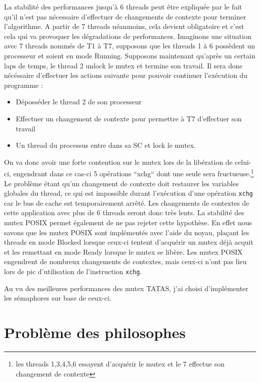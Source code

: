 \noindent La stabilité des performances jusqu'à 6 threads peut être expliquée par le fait qu'il n'est pas nécessaire d'effectuer de changements de contexte pour terminer l'algorithme. 
A partir de 7 threads néanmoins, cela devient obligatoire et c'est cela qui va provoquer les dégradations de performances. Imaginons une situation avec 7 threads nommés de T1 à T7, supposons que les threads 1 à 6 possèdent un processeur et soient en mode Running. 
Supposons maintenant qu'après un certain laps de temps, le thread 2 unlock le mutex et termine son travail. Il sera donc nécéssaire d'effectuer les actions suivante pour pouvoir continuer l'exécution du programme : 
\begin{itemize}
    \item Déposséder le thread 2 de son processeur
    \item Effectuer un changement de contexte pour permettre à T7 d'effectuer son travail
    \item Un thread du processus entre dans sa SC et lock le mutex. 
\end{itemize}
On va donc avoir une forte contention sur le mutex lors de la libération de celui-ci, engendrant dans ce cas-ci 5 opérations ``xchg`` dont une seule sera fructueuse.\footnote{les threads 1,3,4,5,6 essayent d'acquérir le mutex et le 7 effectue son changement de contexte}
Le problème étant qu'un changement de contexte doit restaurer les variables globales du thread, ce qui est impossible durant l'exécution d'une opération \texttt{xchg} car le bus de cache est temporairement arrêté. 
Les changements de contextes de cette application avec plus de 6 threads seront donc très lents. La stabilité des mutex POSIX permet également de ne pas rejeter cette hypothèse. En effet nous savons que les mutex POSIX sont implémentés avec l'aide du noyau, 
plaçant les threads en mode Blocked lorsque ceux-ci tentent d'acquérir un mutex déjà acquit et les remettant en mode Ready lorsque le mutex se libère. Les mutex POSIX engendrent de nombreux changements de contextes, mais ceux-ci n'ont pas lieu lors de pic d'utilisation de l'instruction \texttt{xchg}.

\noindent Au vu des meilleures performances des mutex TATAS, j'ai choisi d'implémenter les sémaphores sur base de ceux-ci.
\section{Problème des philosophes}


